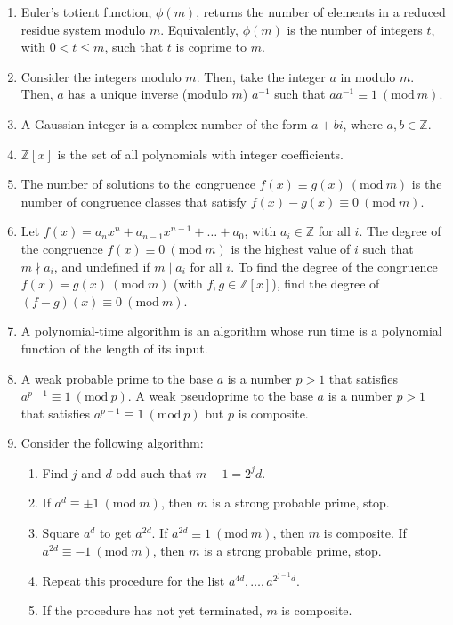 \documentclass[12pt]{article}
\theoremstyle{definition}
\theoremstyle{named}
\newcommand{\Mod}[1]{\ (\mathrm{mod}\ #1)}
\begin{document}
\begin{enumerate}
    \item Euler's totient function, $\phi(m)$, returns the number of elements in a reduced residue system modulo $m$. Equivalently, $\phi(m)$ is the number of integers $t$, with $0 < t \leq m$, such that $t$ is coprime to $m$. 
    \item Consider the integers modulo $m$. Then, take the integer $a$ in modulo $m$. Then, $a$ has a unique inverse (modulo $m$) $a^{-1}$ such that $aa^{-1} \equiv 1 \Mod{m}$. 
    \item A Gaussian integer is a complex number of the form $a + bi$, where $a,b \in \mathbb{Z}$. 
    \item $\mathbb{Z}[x]$ is the set of all polynomials with integer coefficients.
    \item The number of solutions to the congruence $f(x) \equiv g(x) \Mod{m}$ is the number of congruence classes that satisfy $f(x) - g(x) \equiv 0 \Mod{m}$. 
    \item Let $f(x) = a_nx^n + a_{n-1}x^{n-1} + \dots + a_0$, with $a_i \in \mathbb{Z}$ for all $i$. The degree of the congruence $f(x) \equiv 0 \Mod{m}$ is the highest value of $i$ such that $m \nmid a_i$, and undefined if $m \mid a_i$ for all $i$. To find the degree of the congruence $f(x) = g(x) \Mod{m}$ (with $f,g \in \mathbb{Z}[x]$), find the degree of $(f-g)(x) \equiv 0 \Mod{m}$. 
    \item A polynomial-time algorithm is an algorithm whose run time is a polynomial function of the length of its input.
    \item A weak probable prime to the base $a$ is a number $p>1$ that satisfies $a^{p-1} \equiv 1 \Mod{p}$. A weak pseudoprime to the base $a$ is a number $p>1$ that satisfies $a^{p-1} \equiv 1 \Mod{p}$ but $p$ is composite. 
    \item Consider the following algorithm: \\
        \begin{enumerate}
            \item Find $j$ and $d$ odd such that $m-1 = 2^jd$. 
            \item If $a^d \equiv \pm 1 \Mod{m}$, then $m$ is a strong probable prime, stop. 
            \item Square $a^d$ to get $a^{2d}$. If $a^{2d} \equiv 1 \Mod{m}$, then $m$ is composite. If $a^{2d} \equiv -1 \Mod{m}$, then $m$ is a strong probable prime, stop. 
            \item Repeat this procedure for the list $a^{4d}, \dots, a^{2^{j-1}d}$. 
            \item If the procedure has not yet terminated, $m$ is composite. 

\end{enumerate}
\end{enumerate}
\end{document}
